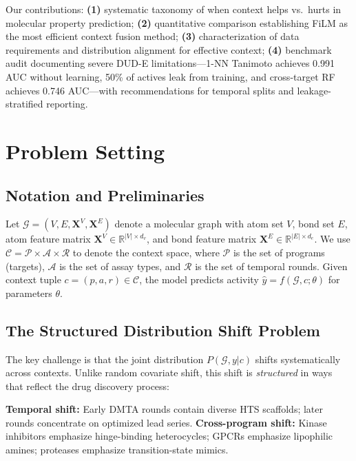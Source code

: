 \documentclass[sigconf,anonymous]{acmart}
\begin{document}
Our contributions: \textbf{(1)} systematic taxonomy of when context helps vs.\ hurts in molecular property prediction; \textbf{(2)} quantitative comparison establishing FiLM as the most efficient context fusion method; \textbf{(3)} characterization of data requirements and distribution alignment for effective context; \textbf{(4)} benchmark audit documenting severe DUD-E limitations---1-NN Tanimoto achieves 0.991 AUC without learning, 50\% of actives leak from training, and cross-target RF achieves 0.746 AUC---with recommendations for temporal splits and leakage-stratified reporting.

\section{Problem Setting}
\label{sec:problem}

\subsection{Notation and Preliminaries}

Let $\mathcal{G} = (V, E, \mathbf{X}^V, \mathbf{X}^E)$ denote a molecular graph with atom set $V$, bond set $E$, atom feature matrix $\mathbf{X}^V \in \mathbb{R}^{|V| \times d_v}$, and bond feature matrix $\mathbf{X}^E \in \mathbb{R}^{|E| \times d_e}$. We use $\mathcal{C} = \mathcal{P} \times \mathcal{A} \times \mathcal{R}$ to denote the context space, where $\mathcal{P}$ is the set of programs (targets), $\mathcal{A}$ is the set of assay types, and $\mathcal{R}$ is the set of temporal rounds. Given context tuple $c = (p, a, r) \in \mathcal{C}$, the model predicts activity $\hat{y} = f(\mathcal{G}, c; \theta)$ for parameters $\theta$.

\subsection{The Structured Distribution Shift Problem}

The key challenge is that the joint distribution $P(\mathcal{G}, y | c)$ shifts systematically across contexts. Unlike random covariate shift, this shift is \textit{structured} in ways that reflect the drug discovery process:

\textbf{Temporal shift:} Early DMTA rounds contain diverse HTS scaffolds; later rounds concentrate on optimized lead series. \textbf{Cross-program shift:} Kinase inhibitors emphasize hinge-binding heterocycles; GPCRs emphasize lipophilic amines; proteases emphasize transition-state mimics.
\end{document}
